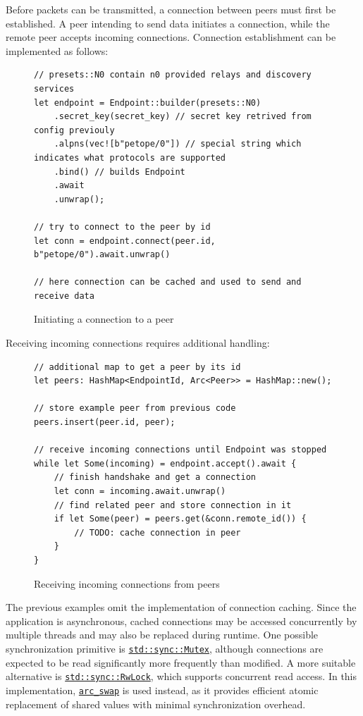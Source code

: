 \documentclass[a4paper, 10pt]{article}
\begin{document}
Before packets can be transmitted, a connection between peers must first be established.
A peer intending to send data initiates a connection, while the remote peer accepts incoming connections.
Connection establishment can be implemented as follows:
\begin{figure}[H]
  \begin{verbatim}
// presets::N0 contain n0 provided relays and discovery services
let endpoint = Endpoint::builder(presets::N0)
    .secret_key(secret_key) // secret key retrived from config previouly
    .alpns(vec![b"petope/0"]) // special string which indicates what protocols are supported
    .bind() // builds Endpoint
    .await
    .unwrap();

// try to connect to the peer by id
let conn = endpoint.connect(peer.id, b"petope/0").await.unwrap()

// here connection can be cached and used to send and receive data
  \end{verbatim}
  \caption{Initiating a connection to a peer}
\end{figure}

Receiving incoming connections requires additional handling:
\begin{figure}[H]
  \begin{verbatim}
// additional map to get a peer by its id
let peers: HashMap<EndpointId, Arc<Peer>> = HashMap::new();

// store example peer from previous code
peers.insert(peer.id, peer);

// receive incoming connections until Endpoint was stopped
while let Some(incoming) = endpoint.accept().await {
    // finish handshake and get a connection
    let conn = incoming.await.unwrap() 
    // find related peer and store connection in it
    if let Some(peer) = peers.get(&conn.remote_id()) {
        // TODO: cache connection in peer
    }
}
  \end{verbatim}
  \caption{Receiving incoming connections from peers}
\end{figure}

The previous examples omit the implementation of connection caching.
Since the application is asynchronous, cached connections may be accessed concurrently by multiple threads and may also be replaced during runtime.
One possible synchronization primitive is
\href{https://doc.rust-lang.org/std/sync/struct.Mutex.html}{\texttt{std::sync::Mutex}},
although connections are expected to be read significantly more frequently than modified.
A more suitable alternative is
\href{https://doc.rust-lang.org/std/sync/struct.RwLock.html}{\texttt{std::sync::RwLock}},
which supports concurrent read access.
In this implementation,
\href{https://docs.rs/arc-swap/latest/arc_swap/}{\texttt{arc\_swap}}
is used instead, as it provides efficient atomic replacement of shared values with minimal synchronization overhead.
\end{document}
